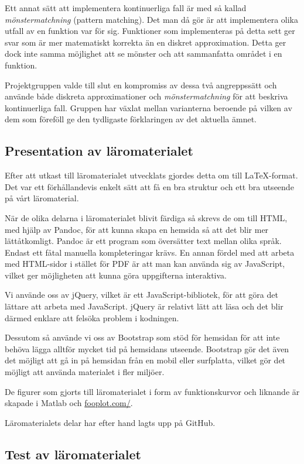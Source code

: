 \documentclass[12pt,a4paper,twoside,openright]{article}
\begin{document}
Ett annat sätt att implementera kontinuerliga fall är med så kallad
\textit{mönstermatchning} (pattern matching). Det man då gör är att
implementera olika utfall av en funktion var för sig. Funktioner som
implementeras på detta sett ger svar som är mer matematiskt korrekta
än en diskret approximation. Detta ger dock inte samma möjlighet att
se mönster och att sammanfatta området i en funktion.

Projektgruppen valde till slut en kompromiss av dessa två angreppssätt
och använde både diskreta approximationer och
\textit{mönstermatchning} för att beskriva kontinuerliga fall. Gruppen
har växlat mellan varianterna beroende på vilken av dem som föreföll
ge den tydligaste förklaringen av det aktuella ämnet.

\subsection{Presentation av läromaterialet}
Efter att utkast till läromaterialet utvecklats gjordes detta om till
LaTeX-format. Det var ett förhållandevis enkelt sätt att få en bra
struktur och ett bra utseende på vårt läromaterial.

När de olika delarna i läromaterialet blivit färdiga så skrevs de om
till HTML, med hjälp av Pandoc, för att kunna skapa en hemsida så att
det blir mer lätt\-åtkomligt. Pandoc är ett program som översätter
text mellan olika språk. Endast ett fåtal manuella kompleteringar
krävs.  En annan fördel med att arbeta med HTML-sidor i stället för
PDF är att man kan använda sig av JavaScript, vilket ger möjligheten
att kunna göra uppgifterna interaktiva.

Vi använde oss av jQuery, vilket är ett JavaScript-bibliotek, för att
göra det lättare att arbeta med JavaScript. jQuery är relativt lätt
att läsa och det blir därmed enklare att felsöka problem i kodningen.

Dessutom så använde vi oss av Bootstrap som stöd för hemsidan för att inte
behöva lägga alltför mycket tid på hemsidans utseende. Bootstrap gör
det även det möjligt att gå in på hemsidan från en mobil eller
surfplatta, vilket gör det möjligt att använda materialet i fler
miljöer.

De figurer som gjorts till läromaterialet i form av funktionskurvor
och liknande är skapade i Matlab och \url{fooplot.com/}.

Läromaterialets delar har efter hand lagts upp på GitHub.

\subsection{Test av läromaterialet}
\label{sec:test}
\end{document}
